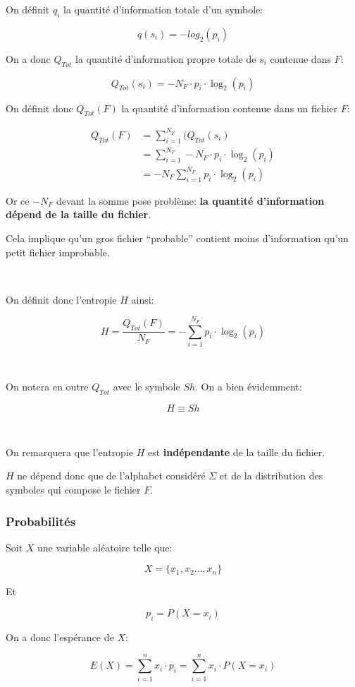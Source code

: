 \documentclass[a4paper,11pt]{article}
\newcommand{\ti}{\cdot}
\begin{document}
On définit $q_i$ la quantité d'information totale d'un symbole:

$$ q(s_i) = -log_2(p_i) $$

On a donc $Q_{Tot}$ la quantité d'information propre totale de $s_i$ contenue
dans $F$:

$$ Q_{Tot}(s_i) = -N_F \cdot p_i \cdot \log_2(p_i)$$

On définit donc $Q_{Tot}(F)$ la quantité d'information contenue dans un fichier
$F$:

\begin{align*}
  Q_{Tot}(F) &= \sum_{i = 1}^{N_F}(Q_{Tot}(s_i) \\
             &= \sum_{i = 1}^{N_F} -N_F \ti p_i \ti \log_2(p_i) \\
             &= -N_F \sum_{i = 1}^{N_F}p_i \ti \log_2(p_i)
\end{align*}

Or ce $-N_F$ devant la somme pose problème:  \textbf{la quantité d'information
  dépend de la taille du fichier}.

Cela implique qu'un gros fichier ``probable'' contient moins d'information qu'un
petit fichier improbable.

\

On définit donc l'entropie $H$ ainsi:

$$ H = \frac{Q_{Tot}(F)}{N_F} = - \sum_{i = 1}^{N_F}p_i \ti \log_2(p_i)$$

\

On notera en outre $Q_{Tot}$ avec le symbole $Sh$. On a bien évidemment:

$$ H \equiv Sh $$

\

On remarquera que l'entropie $H$ est \textbf{indépendante} de la taille du
fichier.

$H$ ne dépend donc que de l'alphabet considéré $\Sigma$ et de la distribution
des symboles qui compose le fichier $F$.

\subsubsection{Probabilités}

Soit $X$ une variable aléatoire telle que:

$$ X = \{x_1, x_2 ..., x_n\}$$

Et

$$ p_i = P(X = x_i) $$

On a donc l'espérance de $X$:

$$ E(X) = \sum_{i = 1}^nx_i \ti p_i = \sum_{i = 1}^nx_i \ti P(X = x_i) $$
\end{document}

